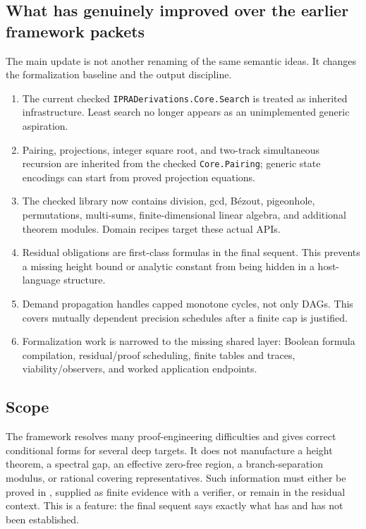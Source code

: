 \subsection{What has genuinely improved over the earlier framework packets}

The main update is not another renaming of the same semantic ideas.  It changes the formalization baseline and the output discipline.
\begin{enumerate}[label=(\arabic*)]
  \item The current checked \texttt{IPRADerivations.Core.Search} is treated as inherited infrastructure.  Least search no longer appears as an unimplemented generic aspiration.
  \item Pairing, projections, integer square root, and two-track simultaneous recursion are inherited from the checked \texttt{Core.Pairing}; generic state encodings can start from proved projection equations.
  \item The checked library now contains division, gcd, B\'ezout, pigeonhole, permutations, multi-sums, finite-dimensional linear algebra, and additional theorem modules.  Domain recipes target these actual APIs.
  \item Residual obligations are first-class formulas in the final sequent.  This prevents a missing height bound or analytic constant from being hidden in a host-language structure.
  \item Demand propagation handles capped monotone cycles, not only DAGs.  This covers mutually dependent precision schedules after a finite cap is justified.
  \item Formalization work is narrowed to the missing shared layer: Boolean formula compilation, residual/proof scheduling, finite tables and traces, viability/observers, and worked application endpoints.
\end{enumerate}

\subsection{Scope}

The framework resolves many proof-engineering difficulties and gives correct conditional forms for several deep targets.  It does not manufacture a height theorem, a spectral gap, an effective zero-free region, a branch-separation modulus, or rational covering representatives.  Such information must either be proved in \iPRA, supplied as finite evidence with a verifier, or remain in the residual context.  This is a feature: the final sequent says exactly what has and has not been established.
